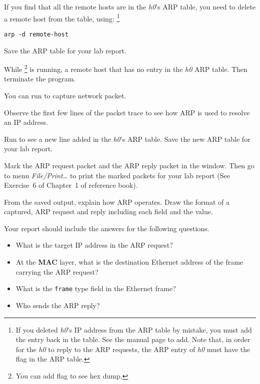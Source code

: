 \documentclass{../UTNetLab}
\begin{document}
If you find that all the remote hosts are in the \textit{h0}’s ARP table, you need to delete a remote host from the table, using:
\footnote{If you deleted \textit{h0}’s IP address from the ARP table by mistake, you must add the entry back in the table.
    See the  manual page to add.
    Note that, in order for the \textit{h0} to reply to the ARP requests, the ARP entry of \textit{h0} must have the  flag in the ARP table.}
\begin{lstlisting}[emph={remote-host}]
arp -d remote-host
    \end{lstlisting}

Save the ARP table for your lab report.

While \footnote{You can add  flag to see hex dump.} is running,  a remote host that has no entry in the \textit{h0} ARP table.
Then terminate the  program.

You can run  to capture network packet.

Observe the first few lines of the packet trace to see how ARP is used to resolve an IP address.

Run  to see a new line added in the \textit{h0}’s ARP table.
Save the new ARP table for your lab report.

Mark the ARP request packet and the ARP reply packet in the  window.
Then go to menu \textit{File/Print\ldots} to print the marked packets for your lab report (See Exercise~6 of Chapter~1 of reference book).

\begin{report}
    \item From the saved  output, explain how ARP operates.
    Draw the format of a captured, ARP request and reply including each field and the value.
\end{report}

Your report should include the answers for the following questions.
\begin{itemize}
    \item What is the target IP address in the ARP request?
    \item At the \textbf{MAC} layer, what is the destination Ethernet address of the frame carrying the ARP request?
    \item What is the \texttt{frame} type field in the Ethernet frame?
    \item Who sends the ARP reply?
\end{itemize}
\end{document}
